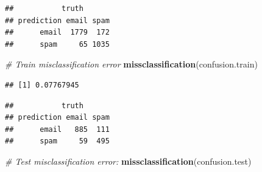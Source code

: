 \documentclass[]{book}
\newenvironment{Shaded}{\begin{snugshade}}{\end{snugshade}}
\newcommand{\CommentTok}[1]{\textcolor[rgb]{0.56,0.35,0.01}{\textit{#1}}}
\newcommand{\DataTypeTok}[1]{\textcolor[rgb]{0.13,0.29,0.53}{#1}}
\newcommand{\DecValTok}[1]{\textcolor[rgb]{0.00,0.00,0.81}{#1}}
\newcommand{\FloatTok}[1]{\textcolor[rgb]{0.00,0.00,0.81}{#1}}
\newcommand{\KeywordTok}[1]{\textcolor[rgb]{0.13,0.29,0.53}{\textbf{#1}}}
\newcommand{\NormalTok}[1]{#1}
\newcommand{\OperatorTok}[1]{\textcolor[rgb]{0.81,0.36,0.00}{\textbf{#1}}}
\newcommand{\StringTok}[1]{\textcolor[rgb]{0.31,0.60,0.02}{#1}}
\theoremstyle{definition}
\theoremstyle{definition}
\theoremstyle{definition}
\theoremstyle{remark}
\begin{document}
\begin{verbatim}
##           truth
## prediction email spam
##      email  1779  172
##      spam     65 1035
\end{verbatim}

\begin{Shaded}
\begin{Highlighting}[]
\CommentTok{# Train misclassification error}
\KeywordTok{missclassification}\NormalTok{(confusion.train)}
\end{Highlighting}
\end{Shaded}

\begin{verbatim}
## [1] 0.07767945
\end{verbatim}

\begin{Shaded}
\end{Shaded}

\begin{verbatim}
##           truth
## prediction email spam
##      email   885  111
##      spam     59  495
\end{verbatim}

\begin{Shaded}
\begin{Highlighting}[]
\CommentTok{# Test misclassification error:}
\KeywordTok{missclassification}\NormalTok{(confusion.test)}
\end{Highlighting}
\end{Shaded}
\end{document}
